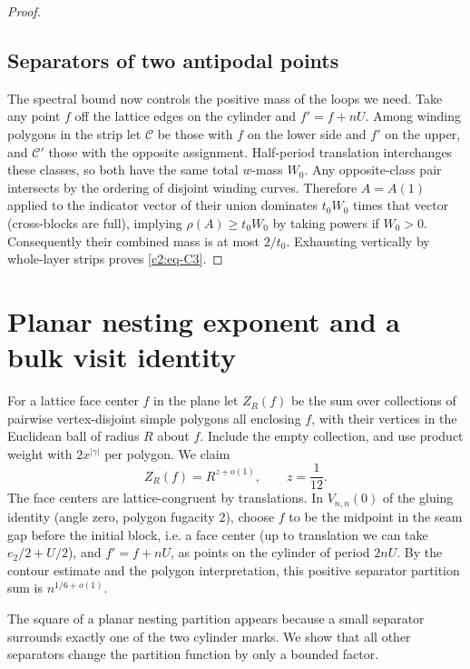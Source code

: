 \begin{proof}
\subsection{Separators of two antipodal points}
The spectral bound now controls the positive mass of the loops we need.
Take any point \(f\) off the lattice edges on the cylinder and \(f'=f+nU\). Among winding polygons in the strip let \(\mathcal C\) be those with \(f\) on the lower side and \(f'\) on the upper, and \(\mathcal C'\) those with the opposite assignment. Half-period translation interchanges these classes, so both have the same total \(w\)-mass \(W_0\). Any opposite-class pair intersects by the ordering of disjoint winding curves. Therefore \(A=A(1)\) applied to the indicator vector of their union dominates \(t_0 W_0\) times that vector (cross-blocks are full), implying \(\rho(A)\ge t_0W_0\) by taking powers if \(W_0>0\). Consequently their combined mass is at most \(2/t_0\).
Exhausting vertically by whole-layer strips proves \eqref{c2:eq-C3}.
\end{proof}

\section{Planar nesting exponent and a bulk visit identity}\label{c2:nesting}

For a lattice face center \(f\) in the plane let \(Z_R(f)\) be the sum over collections of pairwise vertex-disjoint simple polygons all enclosing \(f\), with their vertices in the Euclidean ball of radius \(R\) about \(f\). Include the empty collection, and use product weight with \(2x^{|\gamma|}\) per polygon. We claim
\begin{equation}
 Z_R(f)=R^{z+o(1)},\qquad z=\frac1{12}.                                    \label{c2:eq-G1}
\end{equation}
The face centers are lattice-congruent by translations. In \(V_{n,n}(0)\) of the gluing identity (angle zero, polygon fugacity 2), choose \(f\) to be the midpoint in the seam gap before the initial block, i.e. a face center (up to translation we can take \(e_2/2+U/2\)), and \(f'=f+nU\), as points on the cylinder of period \(2nU\). By the contour estimate and the polygon interpretation, this positive separator partition sum is \(n^{1/6+o(1)}\).

The square of a planar nesting partition appears because a small
separator surrounds exactly one of the two cylinder marks. We show that
all other separators change the partition function by only a bounded
factor.

